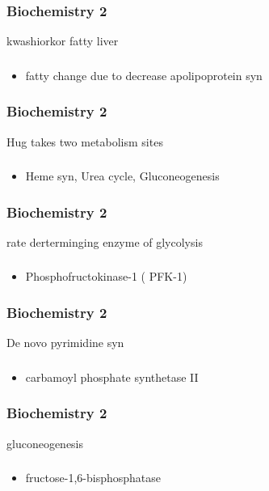 \documentclass[11pt]{beamer}
\begin{document}
\begin{frame}
 \frametitle{Biochemistry 2}
kwashiorkor fatty liver 
\end{frame}

\begin{frame}
 \frametitle{}
\begin{itemize}
\item fatty change due to decrease apolipoprotein syn 
\end{itemize}
\end{frame}

\begin{frame}
 \frametitle{Biochemistry 2}
Hug takes two metabolism sites
\end{frame}

\begin{frame}
 \frametitle{}
\begin{itemize}
\item Heme syn, Urea cycle, Gluconeogenesis 
\end{itemize}
\end{frame}

\begin{frame}
 \frametitle{Biochemistry 2}
rate derterminging enzyme of glycolysis 
\end{frame}

\begin{frame}
 \frametitle{}
\begin{itemize}
\item Phosphofructokinase-1 ( PFK-1) 
\end{itemize}
\end{frame}

\begin{frame}
 \frametitle{Biochemistry 2}
De novo pyrimidine syn
\end{frame}

\begin{frame}
 \frametitle{}
\begin{itemize}
\item carbamoyl phosphate synthetase II 
\end{itemize}
\end{frame}

\begin{frame}
 \frametitle{Biochemistry 2}
gluconeogenesis 
\end{frame}

\begin{frame}
 \frametitle{}
\begin{itemize}
\item fructose-1,6-bisphosphatase
\end{itemize}
\end{frame}
\end{document}
